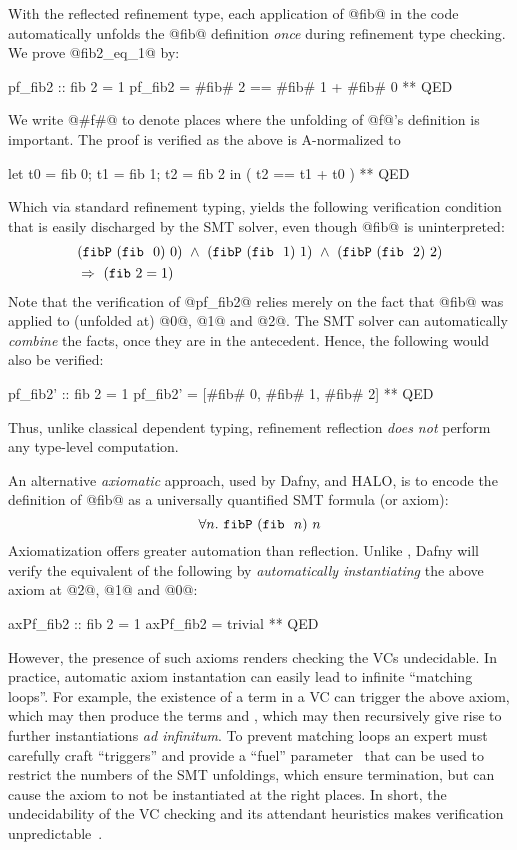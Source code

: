 %
With the reflected refinement type,
each application of @fib@ in the code
automatically unfolds the @fib@ definition
\textit{once} during refinement type checking.
%
We prove @fib2_eq_1@ by:
%
\begin{code}
  pf_fib2 :: { fib 2 = 1 }
  pf_fib2 = #fib# 2 == #fib# 1 + #fib# 0 ** QED
\end{code}
%
We write @#f#@ to denote places where the
unfolding of @f@'s definition is important.
%
The proof is verified as the above is A-normalized to
%
\begin{code}
  let { t0 = fib 0; t1 = fib 1; t2 = fib 2 }
  in  ( t2 == t1 + t0 ) ** QED
\end{code}
%
Which via standard refinement typing, yields the
following verification condition that is easily
discharged by the SMT solver, even though @fib@
is uninterpreted:
%
\begin{align*}
   & (\fibdef\ (\fib\ 0)\ 0) \ \wedge\ (\fibdef\ (\fib\ 1)\ 1) \ \wedge\ (\fibdef\ (\fib\ 2)\ 2) \\
   & \Rightarrow\ (\fib{2} = 1)
\end{align*}
%
Note that the verification of @pf_fib2@ relies
merely on the fact that @fib@ was applied
to (\ie unfolded at) @0@, @1@ and @2@.
%
The SMT solver can automatically \emph{combine}
the facts, once they are in the antecedent.
Hence, the following would also be verified:
%
\begin{code}
  pf_fib2' :: { fib 2 = 1 }
  pf_fib2' = [#fib# 0, #fib# 1, #fib# 2] ** QED
\end{code}
%
%
Thus, unlike classical dependent typing, refinement
reflection \emph{does not} perform any type-level
computation.

%
An alternative \emph{axiomatic} approach, used by Dafny,
\fstar and HALO, is to encode the definition of @fib@ as
a universally quantified SMT formula (or axiom):
$$\forall n.\ \fibdef\ (\fib\ n)\ n$$
%
Axiomatization offers greater automation than
reflection. Unlike \toolname, Dafny
will verify the equivalent of the following by
\emph{automatically instantiating} the above
axiom at @2@, @1@ and @0@:
%
\begin{code}
  axPf_fib2 :: { fib 2 = 1 }
  axPf_fib2 = trivial ** QED
\end{code}

However, the presence of such axioms renders checking
the VCs undecidable. In practice, automatic axiom
instantation can easily lead to infinite ``matching loops''.
%
For example, the existence of a term  in a VC
can trigger the above axiom, which may then produce
the terms  and , which may then
recursively give rise to further instantiations
\emph{ad infinitum}.
%
To prevent matching loops an expert must carefully
craft ``triggers'' and provide a ``fuel''
parameter~\citep{Amin2014ComputingWA} that can be
used to restrict the numbers of the SMT unfoldings,
which ensure termination, but can cause the axiom
to not be instantiated at the right places.
%
In short, the undecidability of the VC checking
and its attendant heuristics makes verification
unpredictable~\citep{Leino16}.

